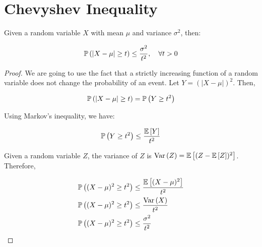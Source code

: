 \section{Chevyshev Inequality}

Given a random variable $X$ with mean $\mu$ and variance $\sigma^2$, then:

\begin{align*}
\mathbb{P}\left(|X - \mu| \geq t\right) \leq \frac{\sigma^2}{t^2}, \quad \forall t > 0
\end{align*}

\begin{proof}
We are going to use the fact that a strictly increasing function of a random variable does not change the probability of an event. Let $Y = (|X - \mu|)^2$. Then,

\begin{align*}
\mathbb{P}\left(|X - \mu| \geq t\right) &= \mathbb{P}\left(Y \geq t^2\right) \\
\end{align*}

Using Markov's inequality, we have:

\begin{align*}
\mathbb{P}\left(Y \geq t^2\right) &\leq \frac{\mathbb{E}\left[Y\right]}{t^2} \\
\end{align*}

Given a random variable $Z$, the variance of $Z$ is $\text{Var}\left(Z\right) = \mathbb{E}\left[(Z - \mathbb{E}\left[Z\right])^2\right]$. Therefore,

\begin{align*}
\mathbb{P}\left((X - \mu)^2 \geq t^2\right) &\leq \frac{\mathbb{E}\left[(X - \mu)^2\right]}{t^2} \\
\mathbb{P}\left((X - \mu)^2 \geq t^2\right) &\leq \frac{\text{Var}\left(X\right)}{t^2} \\
\mathbb{P}\left((X - \mu)^2 \geq t^2\right) &\leq \frac{\sigma^2}{t^2} \\
\end{align*}

\end{proof}
